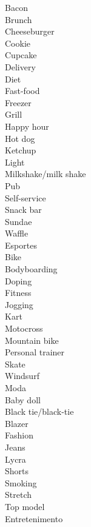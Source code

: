 \documentclass[12pt,a4paper]{article} %
\begin{document}
		Bacon\\
		Brunch\\
		Cheeseburger\\
		Cookie\\
		Cupcake\\
		Delivery\\
		Diet\\
		Fast-food\\
		Freezer\\
		Grill\\
		Happy hour\\
		Hot dog\\
		Ketchup\\
		Light\\
		Milkshake/milk shake\\
		Pub\\
		Self-service\\
		Snack bar\\
		Sundae\\
		Waffle\\
		
	Esportes\\
		
		Bike\\
		Bodyboarding\\
		Doping\\
		Fitness\\
		Jogging\\
		Kart\\
		Motocross\\
		Mountain bike\\
		Personal trainer\\
		Skate \\
		Windsurf\\

	Moda\\
		
		Baby doll\\
		Black tie/black-tie\\
		Blazer\\
		Fashion\\
		Jeans\\
		Lycra\\
		Shorts\\
		Smoking\\
		Stretch\\
		Top model\\

	Entretenimento\\
	
\end{document}
